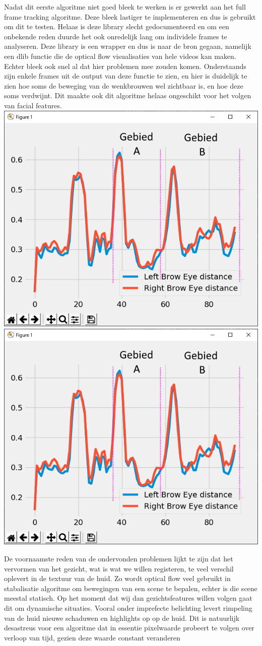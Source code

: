 \documentclass[11pt]{article}
\begin{document}
    \newline
    Nadat dit eerste algoritme niet goed bleek te werken is er gewerkt aan het full frame tracking algoritme. 
    Deze bleek lastiger te implementeren en dus is \emph{\citet{pyflow}}  gebruikt om dit te testen. 
    Helaas is deze library slecht gedocumenteerd en om een onbekende reden duurde het ook onredelijk lang om individele frames te analyseren.
    Deze library is een wrapper en dus is naar de bron gegaan, namelijk een dlib functie die de optical flow visualisaties van hele videos kan maken.
    Echter bleek ook snel al dat hier problemen mee zouden komen. 
    Onderstaands zijn enkele frames uit de output van deze functie te zien, en hier is duidelijk te zien hoe soms de beweging van de wenkbrouwen wel zichtbaar is, en hoe deze soms verdwijnt.
    Dit maakte ook dit algoritme helaas ongeschikt voor het volgen van facial features.
    \includegraphics[width=0.6\linewidth]{Images/Probleem_landmark.png}
    \includegraphics[width=0.6\linewidth]{Images/Probleem_landmark.png}

    \newline
    De voornaamste reden van de ondervonden problemen lijkt te zijn dat het vervormen van het gezicht, wat is wat we willen registeren, te veel verschil oplevert in de textuur van de huid.
    Zo wordt optical flow veel gebruikt in stabalisatie algoritme om bewegingen van een scene te bepalen, echter is die scene meestal statisch. 
    Op het moment dat wij dan gezichtsfeatures willen volgen gaat dit om dynamische situaties.
    Vooral onder imprefecte belichting levert rimpeling van de huid nieuwe schaduwen en highlights op op de huid. 
    Dit is natuurlijk desastreus voor een algoritme dat in essentie pixelwaarde probeert te volgen over verloop van tijd, gezien deze waarde constant veranderen 
\end{document}
